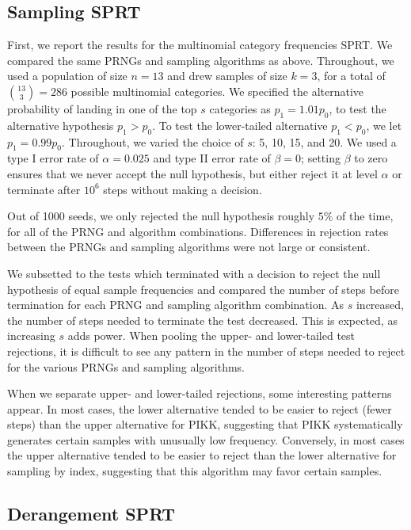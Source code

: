 \documentclass[12pt]{article}
\begin{document}
\subsection{Sampling SPRT}
First, we report the results for the multinomial category frequencies SPRT.
We compared the same PRNGs and sampling algorithms as above.
Throughout, we used a population of size $n=13$ and drew samples of size $k=3$, for a total of ${13 \choose 3} = 286$ possible multinomial categories. 
We specified the alternative probability of landing in one of the top $s$ categories as $p_1 = 1.01p_0$, to test the alternative hypothesis $p_1 > p_0$.
To test the lower-tailed alternative $p_1 < p_0$, we let $p_1 = 0.99 p_0$. 
Throughout, we varied the choice of $s$: 5, 10, 15, and 20. 
We used a type I error rate of $\alpha=0.025$ and type II error rate of $\beta = 0$; 
setting $\beta$ to zero ensures that we never accept the null hypothesis, but either reject it at level $\alpha$ or terminate after $10^6$ steps without making a decision.

Out of 1000 seeds, we only rejected the null hypothesis roughly $5\%$ of the time, for all of the PRNG and algorithm combinations. 
Differences in rejection rates between the PRNGs and sampling algorithms were not large or consistent.

We subsetted to the tests which terminated with a decision to reject the null hypothesis of equal sample frequencies and compared the number of steps before termination for each PRNG and sampling algorithm combination. 
As $s$ increased, the number of steps needed to terminate the test decreased. 
This is expected, as increasing $s$ adds power. 
When pooling the upper- and lower-tailed test rejections, it is difficult to see any pattern in the number of steps needed to reject for the various PRNGs and sampling algorithms. 

When we separate upper- and lower-tailed rejections, some interesting patterns appear. 
In most cases, the lower alternative tended to be easier to reject (fewer steps) than the upper alternative for PIKK, suggesting that PIKK systematically generates certain samples with unusually low frequency. 
Conversely, in most cases the upper alternative tended to be easier to reject than the lower alternative for sampling by index, suggesting that this algorithm may favor certain samples.

\subsection{Derangement SPRT}
\end{document}

